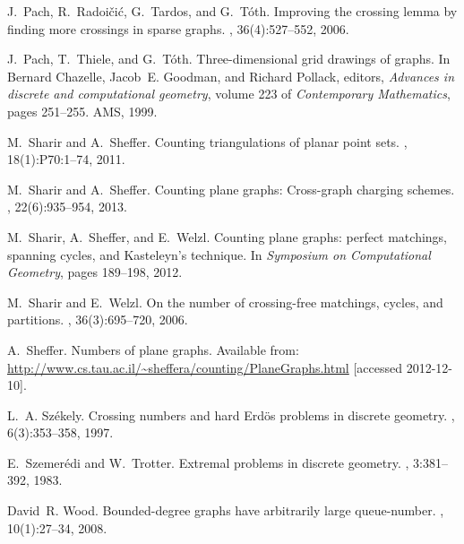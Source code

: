 \documentclass[12pt]{article}
\begin{document}
\begin{thebibliography}{10}
J.~Pach, R.~Radoi\v{c}i{\'c}, G.~Tardos, and G.~T{\'o}th.
\newblock Improving the crossing lemma by finding more crossings in sparse
  graphs.
, 36(4):527--552, 2006.

J.~Pach, T.~Thiele, and G.~T\'{o}th.
\newblock Three-dimensional grid drawings of graphs.
\newblock In Bernard Chazelle, Jacob~E. Goodman, and Richard Pollack, editors,
  {\em Advances in discrete and computational geometry}, volume 223 of {\em
  Contemporary Mathematics}, pages 251--255. AMS, 1999.

M.~Sharir and A.~Sheffer.
\newblock Counting triangulations of planar point sets.
, 18(1):P70:1--74, 2011.

M.~Sharir and A.~Sheffer.
\newblock Counting plane graphs: Cross-graph charging schemes.
, 22(6):935--954, 2013.

M.~Sharir, A.~Sheffer, and E.~Welzl.
\newblock Counting plane graphs: perfect matchings, spanning cycles, and
  {K}asteleyn's technique.
\newblock In {\em Symposium on Computational Geometry}, pages 189--198, 2012.

M.~Sharir and E.~Welzl.
\newblock On the number of crossing-free matchings, cycles, and partitions.
, 36(3):695--720, 2006.

A.~Sheffer.
\newblock Numbers of plane graphs.
\newblock Available from:
  \url{http://www.cs.tau.ac.il/~sheffera/counting/PlaneGraphs.html} [accessed
  2012-12-10].

L.~A. Sz{\'e}kely.
\newblock Crossing numbers and hard {E}rd{\"o}s problems in discrete geometry.
, 6(3):353--358, 1997.

E.~Szemer{\'e}di and W.~Trotter.
\newblock Extremal problems in discrete geometry.
, 3:381--392, 1983.

David~R. Wood.
\newblock Bounded-degree graphs have arbitrarily large queue-number.
,
  10(1):27--34, 2008.

\end{thebibliography}
\end{document}
